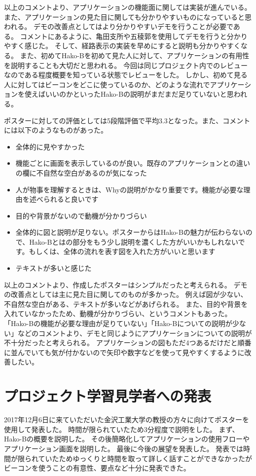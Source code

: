 \documentclass[openany,11pt,papersize]{jsbook}
\begin{document}
以上のコメントより、アプリケーションの機能面に関しては実装が進んでいる。
また、アプリケーションの見た目に関しても分かりやすいものになっていると思われる。
デモの改善点としてはより分かりやすいデモを行うことが必要である。
コメントにあるように、亀田支所や五稜郭を使用してデモを行うと分かりやすく感じた。
そして、経路表示の実装を早めにすると説明も分かりやすくなる。
また、初めてHako-Bを初めて見た人に対して、アプリケーションの有用性を説明することも大切だと思われる。
今回は同じプロジェクト内でのレビューなのである程度概要を知っている状態でレビューをした。
しかし、初めて見る人に対してはビーコンをどこに使っているのか、どのような流れでアプリケーションを使えばいいのかといったHako-Bの説明がまだまだ足りていないと思われる。

ポスターに対しての評価としては5段階評価で平均3.3となった。また、コメントには以下のようなものがあった。
\begin{itemize}

\item 全体的に見やすかった
\item 機能ごとに画面を表示しているのが良い。既存のアプリケーションとの違いの欄に不自然な空白があるのが気になった
\item 人が物事を理解するときは、Whyの説明がかなり重要です。機能が必要な理由を述べられると良いです
\item 目的や背景がないので動機が分かりづらい
\item 全体的に図と説明が足りない。ポスターからはHako-Bの魅力が伝わらないので、Hako-Bとはの部分をもう少し説明を濃くした方がいいかもしれないです。もしくは、全体の流れを表す図を入れた方がいいと思います
\item テキストが多いと感じた

\end{itemize}
以上のコメントより、作成したポスターはシンプルだったと考えられる。
デモの改善点としては主に見た目に関してのものが多かった。
例えば図が少ない、不自然な空白がある、テキストが多いなどがあげられる。
また、目的や背景を入れていなかったため、動機が分かりづらい、というコメントもあった。
「Hako-Bの機能が必要な理由が足りていない」「Hako-Bについての説明が少ない」などのコメントより、デモと同じようにアプリケーションについての説明が不十分だったと考えられる。
アプリケーションの図もただ4つあるだけだと順番に並んでいても気が付かないので矢印や数字などを使って見やすくするように改善したい。


\section{プロジェクト学習見学者への発表}
2017年12月6日に来ていただいた金沢工業大学の教授の方々に向けてポスターを使用して発表した。
時間が限られていたため3分程度で説明をした。
まず、Hako-Bの概要を説明した。
その後簡略化してアプリケーションの使用フローやアプリケーション画面を説明した。
最後に今後の展望を発表した。
発表では時間が限られていたためゆっくりと時間を取って詳しく話すことができなかったがビーコンを使うことの有意性、要点など十分に発表できた。
\end{document}
